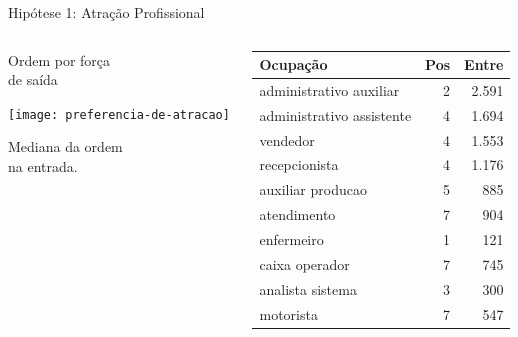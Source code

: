 \documentclass[10pt, hyperref={pdfpagelabels=false, unicode=true}, aspectratio=169]{beamer}
\begin{document}
\begin{frame}[c, label=hipotese-atracao]{Hipótese 1: Atração Profissional}
  \begin{center}
    \begin{columns}[onlytextwidth]
      \begin{column}{0.4\textwidth}
        \centering
        Ordem por força\\
        de \alert{saída}
        
        \begin{center}
        \texttt{[image: preferencia-de-atracao]}
        \end{center}
         
        Mediana da ordem\\
        na \alert{entrada}.
        
      \end{column}
      \begin{column}{0.6\textwidth}
        \centering
        \footnotesize
        \begin{table}[!h]
          \centering
          \begin{tabular}{l|r|r}
            \hline
            Ocupação & Pos & Entre\\
            \hline
            administrativo auxiliar & 2 & 2.591\\
            \hline
            administrativo assistente & 4 & 1.694\\
            \hline
            vendedor & 4 & 1.553\\
            \hline
            recepcionista & 4 & 1.176\\
            \hline
            auxiliar producao & 5 & 885\\
            \hline
            atendimento & 7 & 904\\
            \hline
            enfermeiro & 1 & 121\\
            \hline
            caixa operador & 7 & 745\\
            \hline
            analista sistema & 3 & 300\\
            \hline
            motorista & 7 & 547\\
            \hline
          \end{tabular}
        \end{table}
      \end{column}
    \end{columns}
  \end{center}
\end{frame}
\end{document}
